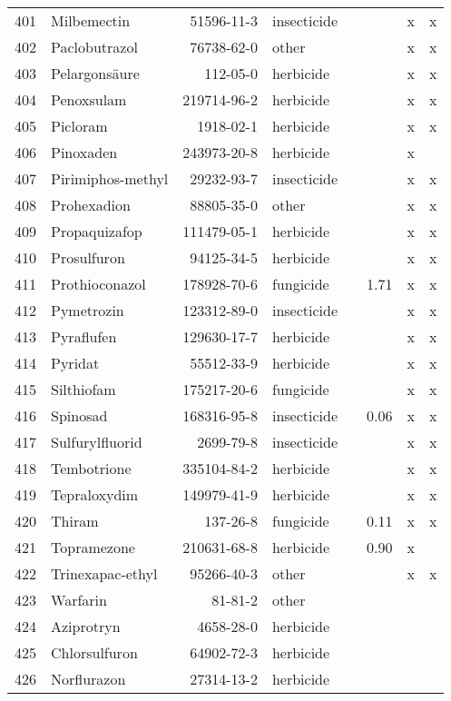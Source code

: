 \begin{longtable}{lp{4cm}rlp{1cm}p{1.5cm}p{1.5cm}p{1cm}}
  401 & Milbemectin & 51596-11-3 & insecticide &  &  & x & x \\ 
  402 & Paclobutrazol & 76738-62-0 & other &  &  & x & x \\ 
  403 & Pelargonsäure & 112-05-0 & herbicide &  &  & x & x \\ 
  404 & Penoxsulam & 219714-96-2 & herbicide &  &  & x & x \\ 
  405 & Picloram & 1918-02-1 & herbicide &  &  & x & x \\ 
  406 & Pinoxaden & 243973-20-8 & herbicide &  &  & x &  \\ 
  407 & Pirimiphos-methyl & 29232-93-7 & insecticide &  &  & x & x \\ 
  408 & Prohexadion & 88805-35-0 & other &  &  & x & x \\ 
  409 & Propaquizafop & 111479-05-1 & herbicide &  &  & x & x \\ 
  410 & Prosulfuron & 94125-34-5 & herbicide &  &  & x & x \\ 
  411 & Prothioconazol & 178928-70-6 & fungicide &  & 1.71 & x & x \\ 
  412 & Pymetrozin & 123312-89-0 & insecticide &  &  & x & x \\ 
  413 & Pyraflufen & 129630-17-7 & herbicide &  &  & x & x \\ 
  414 & Pyridat & 55512-33-9 & herbicide &  &  & x & x \\ 
  415 & Silthiofam & 175217-20-6 & fungicide &  &  & x & x \\ 
  416 & Spinosad & 168316-95-8 & insecticide &  & 0.06 & x & x \\ 
  417 & Sulfurylfluorid & 2699-79-8 & insecticide &  &  & x & x \\ 
  418 & Tembotrione & 335104-84-2 & herbicide &  &  & x & x \\ 
  419 & Tepraloxydim & 149979-41-9 & herbicide &  &  & x & x \\ 
  420 & Thiram & 137-26-8 & fungicide &  & 0.11 & x & x \\ 
  421 & Topramezone & 210631-68-8 & herbicide &  & 0.90 & x &  \\ 
  422 & Trinexapac-ethyl & 95266-40-3 & other &  &  & x & x \\ 
  423 & Warfarin & 81-81-2 & other &  &  &  &  \\ 
  424 & Aziprotryn & 4658-28-0 & herbicide &  &  &  &  \\ 
  425 & Chlorsulfuron & 64902-72-3 & herbicide &  &  &  &  \\ 
  426 & Norflurazon & 27314-13-2 & herbicide &  &  &  &  \\ 

\end{longtable}
